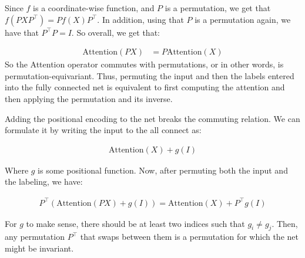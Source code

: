 \documentclass{article}
\begin{document}
\begin{enumerate}
Since $f$ is a coordinate-wise function, and $P$ is a permutation, we get that $f(PXP^\top) = Pf(X)P^{\top}$. In addition, using that $P$ is a permutation again, we have that $P^\top P = I$. So overall, we get that:

\begin{equation*}
  \begin{split}
    \text{Attention} \left( PX \right) &= P  \text{Attention} \left( X \right) 
    \end{split}
\end{equation*}
So the Attention operator commutes with permutations, or in other words, is permutation-equivariant. Thus, permuting the input and then the labels entered into the fully connected net is equivalent to first computing the attention and then applying the permutation and its inverse.


Adding the positional encoding to the net breaks the commuting relation. We can formulate it by writing the input to the all connect as:

\begin{equation*}
  \begin{split}
    \text{Attention} \left( X \right) + g(I)   
    \end{split}
\end{equation*}

Where $g$ is some positional function. Now, after permuting both the input and the labeling, we have:

\begin{equation*}
  \begin{split}
    P^\top \left(\text{Attention} \left( PX \right) + g(I) \right)  = \text{Attention} \left( X \right) + P^\top g(I)   
    \end{split}
\end{equation*}

For $g$ to make sense, there should be at least two indices such that $g_{i} \neq g_{j}$. Then, any permutation $P^{\top}$ that swaps between them is a permutation for which the net might be invariant.

\end{enumerate}
\end{document}
